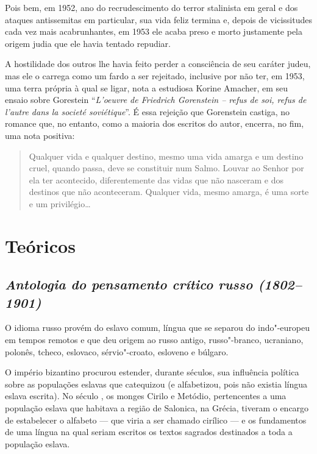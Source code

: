 {Pois bem, em 1952, ano do recrudescimento do terror stalinista em geral
e dos ataques antissemitas em particular, sua vida feliz termina e,
depois de vicissitudes cada vez mais acabrunhantes, em 1953 ele acaba
preso e morto justamente pela origem judia que ele havia tentado
repudiar.

A hostilidade dos outros lhe havia feito perder a consciência de seu
caráter judeu, mas ele o carrega como um fardo a ser rejeitado,
inclusive por não ter, em 1953, uma terra própria à qual se ligar, nota
a estudiosa Korine Amacher, em seu ensaio sobre Gorestein ``\emph{L'oeuvre de
Friedrich Gorenstein -- refus de soi, refus de l'autre dans la societé
soviétique}''. É essa rejeição que Gorenstein castiga, no romance que, no entanto, como a maioria dos escritos do autor, encerra,
no fim, uma nota positiva: 

\begin{quote}
Qualquer vida e qualquer destino, mesmo uma
vida amarga e um destino cruel, quando passa, deve se constituir num
Salmo. Louvar ao Senhor por ela ter acontecido, diferentemente das vidas
que não nasceram e dos destinos que não aconteceram. Qualquer vida,
mesmo amarga, é uma sorte e um privilégio\ldots{}
\end{quote}

\part{Teóricos}

\chapter{\emph{Antologia do pensamento crítico russo (1802--1901)}}

O idioma russo provém do eslavo comum, língua que se separou do
indo"-europeu em tempos remotos e que deu origem ao russo antigo,
russo"-branco, ucraniano, polonês, tcheco, eslovaco, sérvio"-croato,
esloveno e búlgaro.

O império bizantino procurou estender, durante séculos, sua influência
política sobre as populações eslavas que catequizou (e alfabetizou, pois
não existia língua eslava escrita). No século , os monges Cirilo e
Metódio, pertencentes a uma população eslava que habitava a região de
Salonica, na Grécia, tiveram o encargo de estabelecer o alfabeto --- que
viria a ser chamado cirílico --- e os fundamentos de uma língua na qual
seriam escritos os textos sagrados destinados a toda a população eslava.

}
